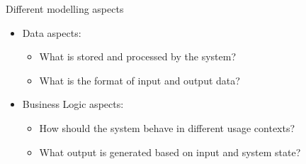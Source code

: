 
\begin{Slide}{Different modelling aspects }

\begin{itemize}
\item Data aspects:
\begin{itemize}
\item What is stored and processed by the system?
\item What is the format of input and output data?

\end{itemize}
\item Business Logic aspects: 
\begin{itemize}
\item How should the system behave in different usage contexts?
\item What output is generated based on input and system state?  

\end{itemize}
\end{itemize}
\end{Slide}